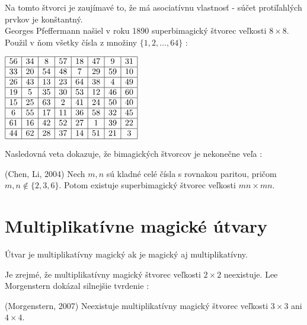 Na tomto štvorci je zaujímavé to, že má asociatívnu vlastnosť - súčet protiľahlých prvkov je konštantný. \\

Georges Pfeffermann našiel v roku 1890 superbimagický štvorec veľkosti $8 \times 8$. Použil v ňom všetky čísla z množiny $\{1, 2, \dots , 64\}$ \cite{multimagie}: \\

\begin{center}
$\begin{array}{ |c|c|c|c|c|c|c|c| }
\hline
56 & 34 & 8 & 57 & 18 & 47 & 9 & 31 \\ 
\hline
33 & 20 & 54 & 48 & 7 & 29 & 59 & 10 \\ 
\hline
26 & 43 & 13 & 23 & 64 & 38 & 4 & 49 \\ 
\hline
19 & 5 & 35 & 30 & 53 & 12 & 46 & 60 \\ 
\hline
15 & 25 & 63 & 2 & 41 & 24 & 50 & 40 \\ 
\hline
6 & 55 & 17 & 11 & 36 & 58 & 32 & 45 \\ 
\hline
61 & 16 & 42 & 52 & 27 & 1 & 39 & 22 \\ 
\hline
44 & 62 & 28 & 37 & 14 & 51 & 21 & 3 \\ 
\hline
\end{array}$
\end{center}

Nasledovná veta dokazuje, že bimagických štvorcov je nekonečne veľa \cite{bimagic}:

\begin{theorem} (Chen, Li, 2004) Nech $m,n$ sú kladné celé čísla s rovnakou paritou, pričom $m,n \notin \{2,3,6\}$. Potom existuje superbimagický štvorec veľkosti $mn \times mn$.
\end{theorem}

\section{Multiplikatívne magické útvary}
\begin{definition} Útvar je multiplikatívny magický ak je magický aj multiplikatívny.
\end{definition}

Je zrejmé, že multiplikatívny magický štvorec veľkosti $2 \times 2$ neexistuje. Lee Morgenstern dokázal silnejšie tvrdenie \cite{multimagie}:

\begin{theorem} (Morgenstern, 2007) Neexistuje multiplikatívny magický štvorec veľkosti $3 \times 3$ ani $4 \times 4$.
\end{theorem}


